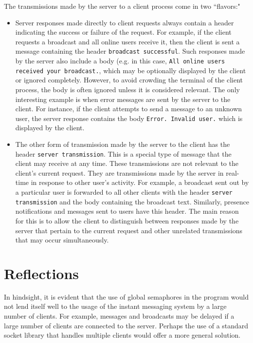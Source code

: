 \documentclass[12pt,a4paper]{article}
\begin{document}
The transmissions made by the server to a client process come in two ``flavors:"
\begin{itemize}
	\item Server responses made directly to client requests always contain a header indicating the success or failure of the request. For example, if the client requests a broadcast and all online users receive it, then the client is sent a message containing the header \verb|broadcast successful|. Such responses made by the server also include a body (e.g. in this case, \verb|All online users received your broadcast.|, which may be optionally displayed by the client or ignored completely. However, to avoid crowding the terminal of the client process, the body is often ignored unless it is considered relevant. The only interesting example is when error messages are sent by the server to the client. For instance, if the client attempts to send a message to an unknown user, the server response contains the body \verb|Error. Invalid user.| which is displayed by the client.
	\item The other form of transmission made by the server to the client has the header \verb|server transmission|. This is a special type of message that the client may receive at any time. These transmissions are not relevant to the client's current request. They are transmissions made by the server in real-time in response to other user's activity. For example, a broadcast sent out by a particular user is forwarded to all other clients with the header \verb|server transmission| and the body containing the broadcast text. Similarly, presence notifications and messages sent to users have this header. The main reason for this is to allow the client to distinguish between responses made by the server that pertain to the current request and other unrelated transmissions that may occur simultaneously.
\end{itemize}

\section{Reflections}
\label{sec:reflections}

In hindsight, it is evident that the use of global semaphores in the program would not lend itself well to the usage of the instant messaging system by a large number of clients. For example, messages and broadcasts may be delayed if a large number of clients are connected to the server. Perhaps the use of a standard socket library that handles multiple clients would offer a more general solution.
\end{document}
